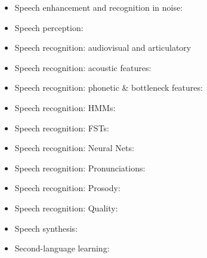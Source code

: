 \documentclass{article}
\begin{document}
\begin{itemize}
\item Speech enhancement and recognition in noise:~\cite{Cooke01b,Ephraim85,Gales96,Martin01,Nadas89}
\item Speech perception:~\cite{Chistovich85,Cooper88,Delattre55,Fowler91,Hickok07,Iverson95,Lotto98,Miller55,Whalen89}
\item Speech recognition: audiovisual and articulatory~\cite{Chu00,Jackson88b,Neti00,Wrench00b}
\item Speech recognition: acoustic features:~\cite{Davis80,Ghitza97,Halberstadt98b,Hermansky90,Hermansky94,Hermansky99}
\item Speech recognition: phonetic \& bottleneck features:~\cite{AbdelattyAli01a,AbdelattyAli01b,Jansen07,Kirchhoff98,Liu96,Loizou95,Niyogi99,Sonderegger12,Vesely2012}
\item Speech recognition: HMMs:~\cite{Rabiner86a,Gales98,Gauvain94,Juang86,Juang1990,Odell94,Povey02,Povey09}
\item Speech recognition: FSTs:~\cite{Mangu00,Mohri02,Oerder93}
\item Speech recognition: Neural Nets:~\cite{Bengio92a,Graves2006,Graves13,Hermansky2000,Jaakkola99,Vesely13interspeech,Waibel89a}
\item Speech recognition: Pronunciations:~\cite{FoslerLussier99a,Kanthak02,Ko2014,Livescu04b,Schultz2001,Sethy02,Vu2012}
\item Speech recognition: Prosody:~\cite{Chen04d,Hirschberg04b,Ostendorf03,Stolcke99}
\item Speech recognition: Quality:~\cite{Gillick89}
\item Speech synthesis:~\cite{Black2006,Fant86,Fujisaki84,Fukada1992,Klatt76,Klatt90,Maeda82,Tokuda2000,Yoshimura99,Yoshimura2001}
\item Second-language learning:~\cite{Best88,Bradlow97,Witt00}
  
\end{itemize}



\end{document}
